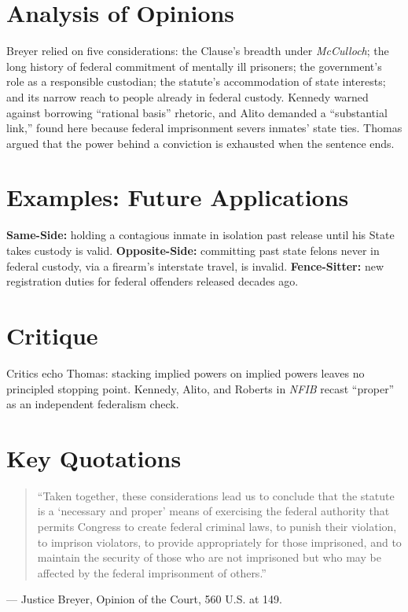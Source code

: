 \documentclass[12pt]{article}
\begin{document}
\section{Analysis of Opinions}
Breyer relied on five considerations: the Clause's breadth under \textit{McCulloch}; the long history of federal commitment of mentally ill prisoners; the government's role as a responsible custodian; the statute's accommodation of state interests; and its narrow reach to people already in federal custody. Kennedy warned against borrowing ``rational basis'' rhetoric, and Alito demanded a ``substantial link,'' found here because federal imprisonment severs inmates' state ties. Thomas argued that the power behind a conviction is exhausted when the sentence ends.

\section{Examples: Future Applications}
\textbf{Same-Side:} holding a contagious inmate in isolation past release until his State takes custody is valid. \textbf{Opposite-Side:} committing past state felons never in federal custody, via a firearm's interstate travel, is invalid. \textbf{Fence-Sitter:} new registration duties for federal offenders released decades ago.

\section{Critique}
Critics echo Thomas: stacking implied powers on implied powers leaves no principled stopping point. Kennedy, Alito, and Roberts in \textit{NFIB} recast ``proper'' as an independent federalism check.

\section{Key Quotations}
\begin{quote}
``Taken together, these considerations lead us to conclude that the statute is a `necessary and proper' means of exercising the federal authority that permits Congress to create federal criminal laws, to punish their violation, to imprison violators, to provide appropriately for those imprisoned, and to maintain the security of those who are not imprisoned but who may be affected by the federal imprisonment of others.''
\end{quote}
\noindent --- Justice Breyer, Opinion of the Court, 560 U.S. at 149.
\end{document}
